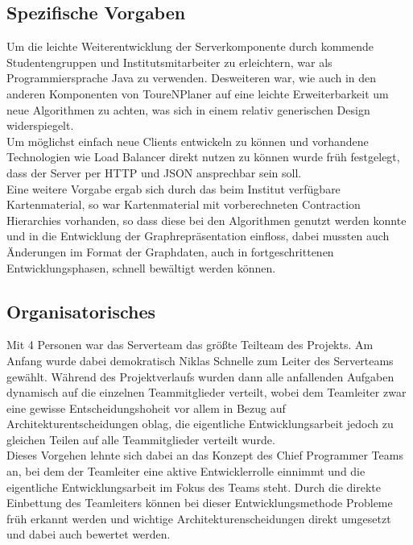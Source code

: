 \subsection*{Spezifische Vorgaben}
Um die leichte Weiterentwicklung der Serverkomponente durch kommende Studentengruppen und Institutsmitarbeiter zu erleichtern, war als Programmiersprache Java zu verwenden. Desweiteren war, wie auch in den anderen Komponenten von ToureNPlaner auf eine leichte Erweiterbarkeit um neue Algorithmen zu achten, was sich in einem relativ generischen Design widerspiegelt.\\
Um möglichst einfach neue Clients entwickeln zu können und vorhandene Technologien wie Load Balancer direkt nutzen zu können wurde früh festgelegt, dass der Server per HTTP und JSON ansprechbar sein soll.\\
Eine weitere Vorgabe ergab sich durch das beim Institut verfügbare Kartenmaterial, so war Kartenmaterial mit vorberechneten Contraction Hierarchies vorhanden, so dass diese bei den Algorithmen genutzt werden konnte und in die Entwicklung der Graphrepräsentation einfloss, dabei mussten auch Änderungen im Format der Graphdaten, auch in fortgeschrittenen Entwicklungsphasen, schnell bewältigt werden können.
\subsection*{Organisatorisches}
Mit 4 Personen war das Serverteam das größte Teilteam des Projekts. Am Anfang wurde dabei demokratisch Niklas Schnelle zum Leiter des Serverteams gewählt. Während des Projektverlaufs wurden dann alle anfallenden Aufgaben dynamisch auf die einzelnen Teammitglieder verteilt, wobei dem Teamleiter zwar eine gewisse Entscheidungshoheit vor allem in Bezug auf Architekturentscheidungen oblag, die eigentliche Entwicklungsarbeit jedoch zu gleichen Teilen auf alle Teammitglieder verteilt wurde.\\
Dieses Vorgehen lehnte sich dabei an das Konzept des Chief Programmer Teams an, bei dem der Teamleiter eine aktive Entwicklerrolle einnimmt und die eigentliche Entwicklungsarbeit im Fokus des Teams steht. Durch die direkte Einbettung des Teamleiters können bei dieser Entwicklungsmethode Probleme früh erkannt werden und wichtige Architekturenscheidungen direkt umgesetzt und dabei auch bewertet werden.
